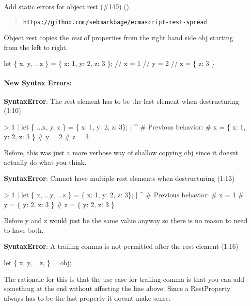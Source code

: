 Add static errors for object rest (\#149) (\href{https://github.com/danez}{\tt })

\begin{quote}
\href{https://github.com/sebmarkbage/ecmascript-rest-spread}{\tt https\+://github.\+com/sebmarkbage/ecmascript-\/rest-\/spread} \end{quote}


Object rest copies the {\itshape rest} of properties from the right hand side {\ttfamily obj} starting from the left to right.


\begin{DoxyCode}
let \{ x, y, ...z \} =  \{ x: 1, y: 2, z: 3 \};
// x = 1
// y = 2
// z = \{ z: 3 \}
\end{DoxyCode}


\paragraph*{New Syntax Errors\+:}

{\bfseries Syntax\+Error}\+: The rest element has to be the last element when destructuring (1\+:10) 
\begin{DoxyCode}
> 1 | let \{ ...x, y, z \} = \{ x: 1, y: 2, z: 3\};
    |           ^
# Previous behavior:
# x = \{ x: 1, y: 2, z: 3 \}
# y = 2
# z = 3
\end{DoxyCode}


Before, this was just a more verbose way of shallow copying {\ttfamily obj} since it doesn\textquotesingle{}t actually do what you think.

{\bfseries Syntax\+Error}\+: Cannot have multiple rest elements when destructuring (1\+:13)


\begin{DoxyCode}
> 1 | let \{ x, ...y, ...z \} = \{ x: 1, y: 2, z: 3\};
    |              ^
# Previous behavior:
# x = 1
# y = \{ y: 2, z: 3 \}
# z = \{ y: 2, z: 3 \}
\end{DoxyCode}


Before y and z would just be the same value anyway so there is no reason to need to have both.

{\bfseries Syntax\+Error}\+: A trailing comma is not permitted after the rest element (1\+:16)


\begin{DoxyCode}
let \{ x, y, ...z, \} = obj;
\end{DoxyCode}


The rationale for this is that the use case for trailing comma is that you can add something at the end without affecting the line above. Since a Rest\+Property always has to be the last property it doesn\textquotesingle{}t make sense. 



